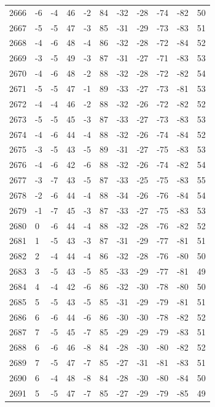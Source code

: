 \begin{table}[H]
\begin{tabular}{lllllllllll}
2666 & -6 & -4 & 46 & -2 & 84 & -32 & -28 & -74 & -82 & 50 \\
2667 & -5 & -5 & 47 & -3 & 85 & -31 & -29 & -73 & -83 & 51 \\
2668 & -4 & -6 & 48 & -4 & 86 & -32 & -28 & -72 & -84 & 52 \\
2669 & -3 & -5 & 49 & -3 & 87 & -31 & -27 & -71 & -83 & 53 \\
2670 & -4 & -6 & 48 & -2 & 88 & -32 & -28 & -72 & -82 & 54 \\
2671 & -5 & -5 & 47 & -1 & 89 & -33 & -27 & -73 & -81 & 53 \\
2672 & -4 & -4 & 46 & -2 & 88 & -32 & -26 & -72 & -82 & 52 \\
2673 & -5 & -5 & 45 & -3 & 87 & -33 & -27 & -73 & -83 & 53 \\
2674 & -4 & -6 & 44 & -4 & 88 & -32 & -26 & -74 & -84 & 52 \\
2675 & -3 & -5 & 43 & -5 & 89 & -31 & -27 & -75 & -83 & 53 \\
2676 & -4 & -6 & 42 & -6 & 88 & -32 & -26 & -74 & -82 & 54 \\
2677 & -3 & -7 & 43 & -5 & 87 & -33 & -25 & -75 & -83 & 55 \\
2678 & -2 & -6 & 44 & -4 & 88 & -34 & -26 & -76 & -84 & 54 \\
2679 & -1 & -7 & 45 & -3 & 87 & -33 & -27 & -75 & -83 & 53 \\
2680 & 0 & -6 & 44 & -4 & 88 & -32 & -28 & -76 & -82 & 52 \\
2681 & 1 & -5 & 43 & -3 & 87 & -31 & -29 & -77 & -81 & 51 \\
2682 & 2 & -4 & 44 & -4 & 86 & -32 & -28 & -76 & -80 & 50 \\
2683 & 3 & -5 & 43 & -5 & 85 & -33 & -29 & -77 & -81 & 49 \\
2684 & 4 & -4 & 42 & -6 & 86 & -32 & -30 & -78 & -80 & 50 \\
2685 & 5 & -5 & 43 & -5 & 85 & -31 & -29 & -79 & -81 & 51 \\
2686 & 6 & -6 & 44 & -6 & 86 & -30 & -30 & -78 & -82 & 52 \\
2687 & 7 & -5 & 45 & -7 & 85 & -29 & -29 & -79 & -83 & 51 \\
2688 & 6 & -6 & 46 & -8 & 84 & -28 & -30 & -80 & -82 & 52 \\
2689 & 7 & -5 & 47 & -7 & 85 & -27 & -31 & -81 & -83 & 51 \\
2690 & 6 & -4 & 48 & -8 & 84 & -28 & -30 & -80 & -84 & 50 \\
2691 & 5 & -5 & 47 & -7 & 85 & -27 & -29 & -79 & -85 & 49 \\

\end{tabular}
\end{table}
